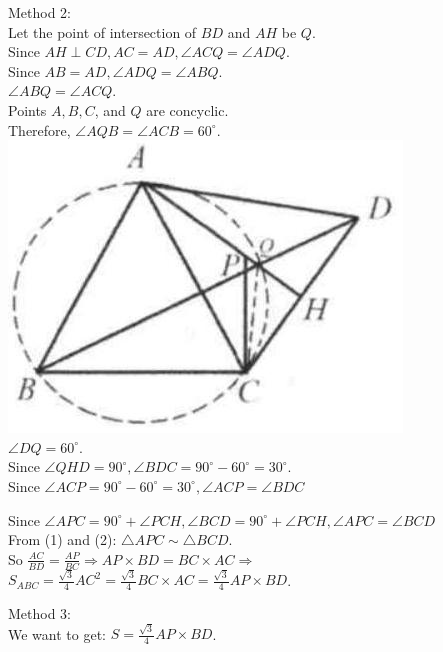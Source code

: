 \documentclass{article}
\begin{document}
Method 2:\\
Let the point of intersection of \(B D\) and \(A H\) be \(Q\).\\
Since \(A H \perp C D, A C=A D, \angle A C Q=\angle A D Q\).\\
Since \(A B=A D, \angle A D Q=\angle A B Q\).\\
\(\angle A B Q=\angle A C Q\).\\
Points \(A, B, C\), and \(Q\) are concyclic.\\
Therefore, \(\angle A Q B=\angle A C B=60^{\circ}\).\\
\centering
\includegraphics[width=\textwidth]{images/200.jpg}\\
\(\angle D Q=60^{\circ}\).\\
Since \(\angle Q H D=90^{\circ}, \angle B D C=90^{\circ}-60^{\circ}=30^{\circ}\).\\
Since \(\angle A C P=90^{\circ}-60^{\circ}=30^{\circ}, \angle A C P=\angle B D C\)

Since \(\angle A P C=90^{\circ}+\angle P C H, \angle B C D=90^{\circ}+\angle P C H, \angle A P C=\angle B C D\)\\
From (1) and (2): \(\triangle A P C \sim \triangle B C D\).\\
So \(\frac{A C}{B D}=\frac{A P}{B C} \Rightarrow A P \times B D=B C \times A C \Rightarrow\)\\
\(S_{A B C}=\frac{\sqrt{3}}{4} A C^{2}=\frac{\sqrt{3}}{4} B C \times A C=\frac{\sqrt{3}}{4} A P \times B D\).

Method 3:\\
We want to get: \(S=\frac{\sqrt{3}}{4} A P \times B D\).
\end{document}

